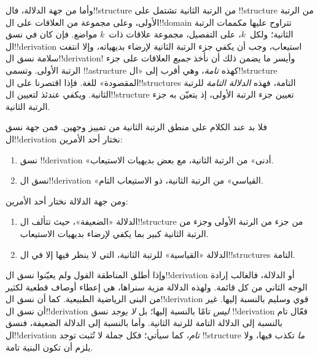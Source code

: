 \documentclass[../../../include/open-logic-section]{subfiles}
\begin{document}
وأما من جهة الدلالة، فال!!{structure} من الرتبة الثانية
تشتمل على !!{structure} من الرتبة الأولى، وعلى مجموعة من
العلاقات على ال!!{domain} تتراوح عليها مكممات الرتبة الثانية؛
ولكل~$k$، على التفصيل، مجموعة علاقات ذات~$k$ مواضع.
فإن كان في نسق ال!!{derivation} استيعاب، وجب أن يكفي جزء
الرتبة الثانية لإرضاء بديهياته، وإلا انتفت سلامة نسق
ال!!{derivation}!{} وأيسر ما يضمن ذلك أن نأخذ
\emph{جميع} العلاقات على جزء الرتبة الأولى. وتسمى
!!a{structure} كهذه \emph{تامة}، وهي أقرب إلى
«ال!!{structure} المقصودة» للغة. فإذا اقتصرنا على
ال!!{structure}s التامة، فهذه \emph{الدلالة التامة} للرتبة
الثانية. ويكفي عندئذ لتعيين ال!!{structure} تعيين جزء الرتبة
الأولى، إذ يتعيّن به جزء الرتبة الثانية.

فلا بد عند الكلام على منطق الرتبة الثانية من تمييز وجهين.
فمن جهة نسق ال!!{derivation} نختار أحد الأمرين:
\begin{enumerate}
\item نسق !!{derivation} «أدنى» من الرتبة الثانية، مع بعض بديهيات
  الاستيعاب.
\item نسق ال!!{derivation} «القياسي» من الرتبة الثانية، ذو الاستيعاب
  التام.
\end{enumerate}
ومن جهة الدلالة نختار أحد الأمرين:
\begin{enumerate}
\item الدلالة «الضعيفة»، حيث تتألف ال!!{structure} من جزء من الرتبة
  الأولى وجزء من الرتبة الثانية كبير بما يكفي لإرضاء بديهيات
  الاستيعاب.
\item الدلالة «القياسية» للرتبة الثانية، التي لا ينظر فيها إلا في
  ال!!{structure}s التامة.
\end{enumerate}
وإذا أطلق المناطقة القول ولم يعيّنوا نسق ال!!{derivation}
أو الدلالة، فالغالب إرادة الوجه الثاني من كل قائمة. ولهذه
الدلالة مزية سنراها، هي إعطاء أوصاف قطعية لكثير من البنى
الرياضية الطبيعية. كما أن نسق ال!!{derivation} قوي وسليم
بالنسبة إليها. غير أن نسق ال!!{derivation} \emph{ليس} تامًا
بالنسبة إليها؛ بل \emph{لا يوجد} نسق !!{derivation} فعّال تام
بالنسبة إلى الدلالة التامة للرتبة الثانية. وأما بالنسبة إلى
الدلالة الضعيفة، فنسق ال!!{derivation} \emph{تام}، كما سيأتي؛
فكل جملة لا تُثبت توجد !!{structure} \emph{ما} تكذب فيها،
ولا يلزم أن تكون البنية تامة.
\end{document}
